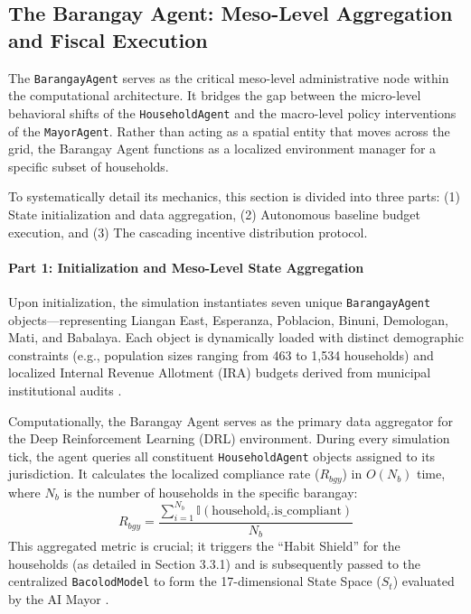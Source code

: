 \subsection{The Barangay Agent: Meso-Level Aggregation and Fiscal Execution}

The \texttt{BarangayAgent} serves as the critical meso-level administrative node within the computational architecture. It bridges the gap between the micro-level behavioral shifts of the \texttt{HouseholdAgent} and the macro-level policy interventions of the \texttt{MayorAgent}. Rather than acting as a spatial entity that moves across the grid, the Barangay Agent functions as a localized environment manager for a specific subset of households. 

To systematically detail its mechanics, this section is divided into three parts: (1) State initialization and data aggregation, (2) Autonomous baseline budget execution, and (3) The cascading incentive distribution protocol.

\paragraph{Part 1: Initialization and Meso-Level State Aggregation}

Upon initialization, the simulation instantiates seven unique \texttt{BarangayAgent} objects—representing Liangan East, Esperanza, Poblacion, Binuni, Demologan, Mati, and Babalaya. Each object is dynamically loaded with distinct demographic constraints (e.g., population sizes ranging from 463 to 1,534 households) and localized Internal Revenue Allotment (IRA) budgets derived from municipal institutional audits \citep{Delena2025}.

Computationally, the Barangay Agent serves as the primary data aggregator for the Deep Reinforcement Learning (DRL) environment. During every simulation tick, the agent queries all constituent \texttt{HouseholdAgent} objects assigned to its jurisdiction. It calculates the localized compliance rate ($R_{bgy}$) in $O(N_b)$ time, where $N_b$ is the number of households in the specific barangay:
\begin{equation}
    R_{bgy} = \frac{\sum_{i=1}^{N_b} \mathbb{I}(\text{household}_i.\text{is\_compliant})}{N_b}
\end{equation}
This aggregated metric is crucial; it triggers the ``Habit Shield'' for the households (as detailed in Section 3.3.1) and is subsequently passed to the centralized \texttt{BacolodModel} to form the 17-dimensional State Space ($S_t$) evaluated by the AI Mayor \citep{TianReview2024}.

